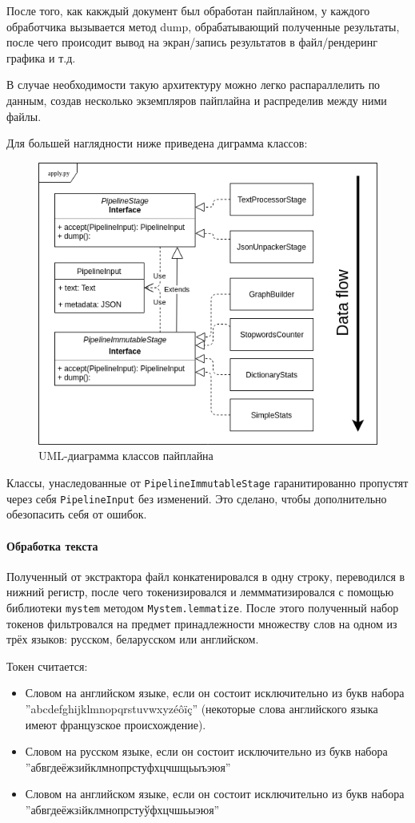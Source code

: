 После того, как какждый документ был обработан пайплайном, у каждого обработчика вызывается метод dump, обрабатывающий полученные результаты, после чего происодит вывод на экран/запись результатов в файл/рендеринг графика и т.д. 

В случае необходимости такую архитектуру можно легко распараллелить по данным, создав несколько экземпляров пайплайна и распределив между ними файлы. 

Для большей наглядности ниже приведена диграмма классов: 

\begin{figure}
	\includegraphics[width=.5\textwidth]{apply_uml_data_flow.png}
	\caption{UML-диаграмма классов пайплайна}
	\label{apply-uml}
\end{figure}

Классы, унаследованные от \texttt{PipelineImmutableStage} гаранитированно пропустят через себя \texttt{PipelineInput} без изменений. Это сделано, чтобы дополнительно обезопасить себя от ошибок.


\paragraph{Обработка текста}

Полученный от экстрактора файл конкатенировался в одну строку, переводился в нижний регистр, после чего токенизировался и леммматизировался с помощью библиотеки \texttt{mystem} методом \texttt{Mystem.lemmatize}. После этого полученный набор токенов фильтровался на предмет принадлежности множеству слов на одном из трёх языков: русском, беларусском или английском. 

Токен считается:
\begin{itemize}
	\item Словом на английском языке, если он состоит исключительно из букв набора ''abcdefghijklmnopqrstuvwxyzéôïç'' (некоторые слова английского языка имеют французское происхождение).
	
	\item Словом на русском языке, если он состоит исключительно из букв набора ''абвгдеёжзийклмнопрстуфхцчшщьыъэюя''
	
	\item Словом на английском языке, если он состоит исключительно из букв набора ''абвгдеёжзiйклмнопрстуўфхцчшьыэюя''
\end{itemize}

